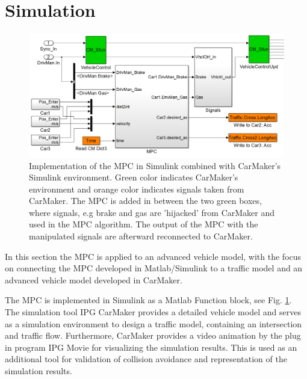 \documentclass[letterpaper,10pt,conference]{ieeeconf}
\begin{document}
\section{Simulation} \label{sec:simulation}
\begin{figure}[]
    \centering
    \includegraphics[width=1.8\columnwidth]{CarMaker_Implement2.png}
    \caption{Implementation of the MPC in Simulink combined with CarMaker's Simulink environment. Green color indicates CarMaker's environment and orange color indicates signals taken from CarMaker. The MPC is added in between the two green boxes, where signals, e.g brake and gas are 'hijacked' from CarMaker and used in the MPC algorithm. The output of the MPC with the manipulated signals are afterward reconnected to CarMaker.}
    \label{fig:CM_Implement}
\end{figure}
In this section the MPC is applied to an advanced vehicle model, with the focus on connecting the MPC developed in Matlab/Simulink to a traffic model and an advanced vehicle model developed in CarMaker.

The MPC is implemented in Simulink as a Matlab Function block, see Fig. \ref{fig:CM_Implement}. The simulation tool IPG CarMaker provides a detailed vehicle model and serves as a simulation environment to design a traffic model, containing an intersection and traffic flow. %
Furthermore, CarMaker provides a video animation by the plug in program IPG Movie for visualizing the simulation results. This is used as an additional tool for validation of collision avoidance and representation of the simulation results.
\end{document}
